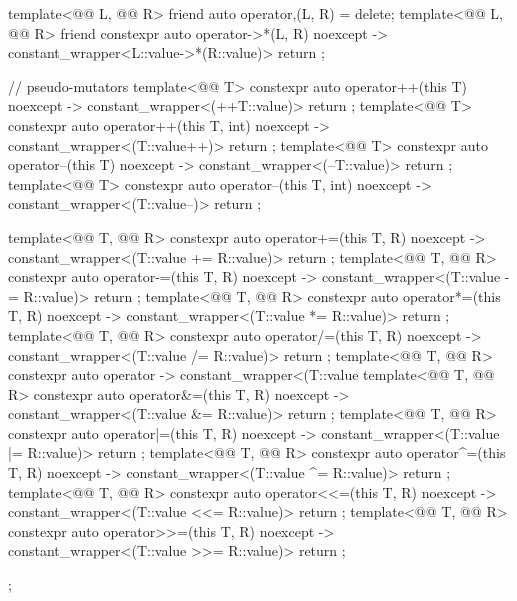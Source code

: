 \begin{codeblock}
{{    template<@@ L, @@ R>
      friend auto operator,(L, R) = delete;
    template<@@ L, @@ R>
      friend constexpr auto operator->*(L, R) noexcept -> constant_wrapper<L::value->*(R::value)>
        { return {}; }

    // pseudo-mutators
    template<@@ T>
      constexpr auto operator++(this T) noexcept
        -> constant_wrapper<(++T::value)> { return {}; }
    template<@@ T>
      constexpr auto operator++(this T, int) noexcept
        -> constant_wrapper<(T::value++)> { return {}; }
    template<@@ T>
      constexpr auto operator--(this T) noexcept
        -> constant_wrapper<(--T::value)> { return {}; }
    template<@@ T>
      constexpr auto operator--(this T, int) noexcept
        -> constant_wrapper<(T::value--)> { return {}; }

    template<@@ T, @@ R>
      constexpr auto operator+=(this T, R) noexcept
        -> constant_wrapper<(T::value += R::value)> { return {}; }
    template<@@ T, @@ R>
      constexpr auto operator-=(this T, R) noexcept
        -> constant_wrapper<(T::value -= R::value)> { return {}; }
    template<@@ T, @@ R>
      constexpr auto operator*=(this T, R) noexcept
        -> constant_wrapper<(T::value *= R::value)> { return {}; }
    template<@@ T, @@ R>
      constexpr auto operator/=(this T, R) noexcept
        -> constant_wrapper<(T::value /= R::value)> { return {}; }
    template<@@ T, @@ R>
      constexpr auto operator%
        -> constant_wrapper<(T::value %
    template<@@ T, @@ R>
      constexpr auto operator&=(this T, R) noexcept
        -> constant_wrapper<(T::value &= R::value)> { return {}; }
    template<@@ T, @@ R>
      constexpr auto operator|=(this T, R) noexcept
        -> constant_wrapper<(T::value |= R::value)> { return {}; }
    template<@@ T, @@ R>
      constexpr auto operator^=(this T, R) noexcept
        -> constant_wrapper<(T::value ^= R::value)> { return {}; }
    template<@@ T, @@ R>
      constexpr auto operator<<=(this T, R) noexcept
        -> constant_wrapper<(T::value <<= R::value)> { return {}; }
    template<@@ T, @@ R>
      constexpr auto operator>>=(this T, R) noexcept
        -> constant_wrapper<(T::value >>= R::value)> { return {}; }
  };

}
\end{codeblock}
